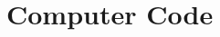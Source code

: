 \documentclass[../Main/main.tex]{subfiles}
\begin{document}
	\chapter{Computer Code}
	
\end{document}
